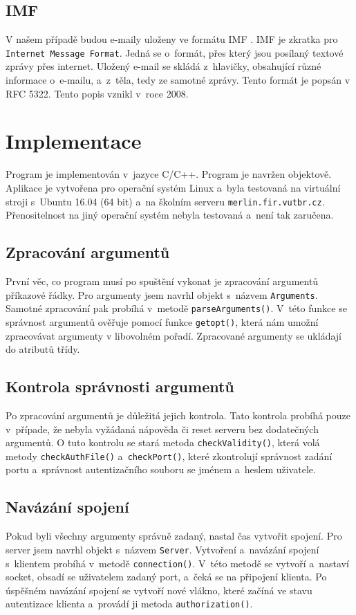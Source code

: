 \documentclass[a4paper, 11pt]{article}
\begin{document}
\subsection{IMF}
V našem případě budou e-maily uloženy ve formátu IMF \cite{IMF}. IMF je zkratka pro \texttt{Internet Message Format}. Jedná se o~formát, přes který jsou posílaný textové zprávy přes internet. Uložený e-mail se skládá z~hlavičky, obsahující různé informace o~e-mailu, a~z~těla, tedy ze samotné zprávy. Tento formát je popsán v RFC 5322. Tento popis vznikl v~roce 2008.

\section{Implementace}
Program je implementován v~jazyce C/C++. Program je navržen objektově. Aplikace je vytvořena pro operační systém Linux a~byla testovaná na virtuální stroji s~Ubuntu 16.04 (64 bit) a~na školním serveru \texttt{merlin.fir.vutbr.cz}. Přenositelnost na jiný operační systém nebyla testovaná a~není tak zaručena.

\subsection{Zpracování argumentů}
První věc, co program musí po spuštění vykonat je zpracování argumentů příkazové řádky. Pro argumenty jsem navrhl objekt s~názvem \texttt{Arguments}. Samotné zpracování pak probíhá v~metodě \texttt{parseArguments()}. V~této funkce se správnost argumentů ověřuje pomocí funkce \texttt{getopt()}, která nám umožní zpracovávat argumenty v libovolném pořadí. Zpracované argumenty se ukládají do atributů třídy.

\subsection{Kontrola správnosti argumentů}
Po zpracování argumentů je důležitá jejich kontrola. Tato kontrola probíhá pouze v~případe, že nebyla vyžádaná nápověda či reset serveru bez dodatečných argumentů. O tuto kontrolu se stará metoda \texttt{checkValidity()}, která volá metody \texttt{checkAuthFile()} a~\texttt{checkPort()}, které zkontrolují správnost zadání portu a~správnost autentizačního souboru se jménem a~heslem uživatele.

\subsection{Navázání spojení}
Pokud byli všechny argumenty správně zadaný, nastal čas vytvořit spojení. Pro server jsem navrhl objekt s~názvem \texttt{Server}. Vytvoření a~navázání spojení s~klientem probíhá v~metodě \texttt{connection()}. V~této metodě se vytvoří a~nastaví socket, obsadí se uživatelem zadaný port, a~čeká se na připojení klienta. Po úspěšném navázání spojení se vytvoří nové vlákno, které začíná ve stavu autentizace klienta a~provádí ji metoda \texttt{authorization()}.
\end{document}
